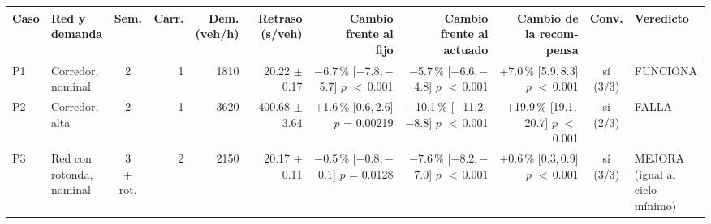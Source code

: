 \begin{table}[H]
\centering
\scriptsize
\setlength{\tabcolsep}{1.5pt}
\begin{tabular}{llcrrrrrrcl}
\toprule
Caso & \makecell[l]{Red y\\demanda} & Sem. & Carr. & \makecell{Dem.\\(veh/h)} & \makecell{Retraso\\(s/veh)} & \makecell{Cambio\\frente al\\fijo} & \makecell{Cambio\\frente al\\actuado} & \makecell{Cambio de\\la recom-\\pensa} & Conv. & Veredicto \\
\midrule
P1 & \makecell[l]{Corredor,\\{}nominal} & 2 & 1 & 1810 & \makecell[r]{20.22\\{}$\pm$ 0.17} & \makecell[r]{$-$6.7\,\%\\{}[$-$7.8,\,$-$5.7]\\$p$ $<$\,0.001} & \makecell[r]{$-$5.7\,\%\\{}[$-$6.6,\,$-$4.8]\\$p$ $<$\,0.001} & \makecell[r]{+7.0\,\%\\{}[5.9,\,8.3]\\$p$ $<$\,0.001} & \makecell[c]{sí\\{}(3/3)} & FUNCIONA \\
P2 & \makecell[l]{Corredor,\\{}alta} & 2 & 1 & 3620 & \makecell[r]{400.68\\{}$\pm$ 3.64} & \makecell[r]{+1.6\,\%\\{}[0.6,\,2.6]\\$p$ = 0.00219} & \makecell[r]{$-$10.1\,\%\\{}[$-$11.2,\,$-$8.8]\\$p$ $<$\,0.001} & \makecell[r]{+19.9\,\%\\{}[19.1,\,20.7]\\$p$ $<$\,0.001} & \makecell[c]{sí\\{}(2/3)} & FALLA \\
P3 & \makecell[l]{Red con\\{}rotonda,\\{}nominal} & \makecell[c]{3\\{}+ rot.} & 2 & 2150 & \makecell[r]{20.17\\{}$\pm$ 0.11} & \makecell[r]{$-$0.5\,\%\\{}[$-$0.8,\,$-$0.1]\\$p$ = 0.0128} & \makecell[r]{$-$7.6\,\%\\{}[$-$8.2,\,$-$7.0]\\$p$ $<$\,0.001} & \makecell[r]{+0.6\,\%\\{}[0.3,\,0.9]\\$p$ $<$\,0.001} & \makecell[c]{sí\\{}(3/3)} & \makecell[l]{MEJORA\\{}(igual al\\{}ciclo mínimo)} \\

\end{tabular}
\end{table}
